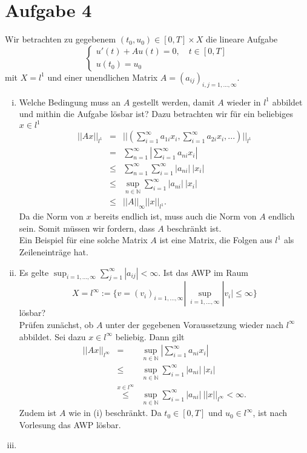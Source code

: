 \documentclass[10pt,a4paper]{article}
\begin{document}
\section*{Aufgabe 4}
Wir betrachten zu gegebenem $(t_0, u_0) \in [0,T] \times X$ die lineare Aufgabe
\begin{equation}
	\begin{cases}
	u'(t) + Au(t) = 0, \quad t\in [0,T]\\
	u(t_0) = u_0
	\end{cases}
\end{equation}
mit $X = l^1$ und einer unendlichen Matrix $A = (a_{ij})_{i,j = 1,...,\infty}$.
\begin{enumerate}[(i)]
\item Welche Bedingung muss an $A$ gestellt werden, damit $A$ wieder in $l^1$ abbildet und mithin die Aufgabe lösbar ist? Dazu betrachten wir für ein beliebiges $x\in l^1$
\begin{eqnarray}
	||Ax||_{l^1} &=& || \left( \sum_{i=1}^{\infty} a_{1i}x_i, \sum_{i=1}^{\infty} a_{2i}x_i, ... \right) ||_{l^1}\\
	&=& \sum_{n=1}^{\infty} | \sum_{i=1}^{\infty} a_{ni}x_i |\\
	&\leq & \sum_{n=1}^{\infty} \sum_{i=1}^{\infty} |a_{ni}| \ |x_i |\\
	&\leq & \sup_{n\in\mathbb{N}} \sum_{i=1}^{\infty} |a_{ni}| \ |x_i |\\
	&\leq & ||A||_{\infty} ||x||_{l^1}.
\end{eqnarray}
Da die Norm von $x$ bereits endlich ist, muss auch die Norm von $A$ endlich sein. Somit müssen wir fordern, dass $A$ beschränkt ist.\\
Ein Beispiel für eine solche Matrix $A$ ist eine Matrix, die Folgen aus $l^1$ als Zeileneinträge hat.

\item Es gelte $\sup_{i=1,...,\infty} \sum_{j=1}^{\infty} |a_{ij}| < \infty$. Ist das AWP im Raum 
\begin{equation}
X = l^{\infty} := \{v = (v_i)_{i=1,...,\infty} | \ \sup_{i=1,...,\infty} |v_i| \leq \infty  \}
\end{equation}
lösbar?\\
Prüfen zunächst, ob $A$ unter der gegebenen Voraussetzung wieder nach $l^{\infty}$ abbildet. Sei dazu $x\in l^{\infty}$ beliebig. Dann gilt
\begin{eqnarray}
	||Ax||_{l^{\infty}} &=& \sup_{n\in\mathbb{N}} | \sum_{i=1}^{\infty} a_{ni} x_i|\\
	&\leq & \sup_{n\in\mathbb{N}} \sum_{i=1}^{\infty} |a_{ni}| \ |x_i|\\
	&\stackrel{x\in l^{\infty}}{\leq}& \sup_{n\in\mathbb{N}} \sum_{i=1}^{\infty} |a_{ni}| \ ||x||_{l^{\infty}} < \infty.
\end{eqnarray}
Zudem ist $A$ wie in (i) beschränkt. Da $t_0 \in [0,T]$ und $u_0\in l^{\infty}$, ist nach Vorlesung das AWP lösbar.

\item %
\end{enumerate}
\end{document}
